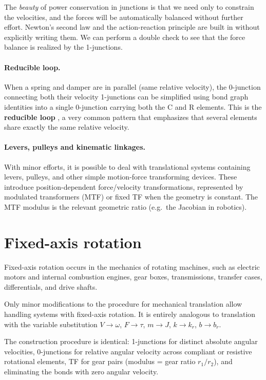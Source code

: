 The \emph{beauty} of power conservation in junctions is that we need only to constrain the velocities, and the forces will be automatically balanced without further effort. Newton's second law and the action-reaction principle are built in without explicitly writing them. We can perform a double check to see that the force balance is realized by the 1-junctions.



\paragraph{Reducible loop.}
When a spring and damper are in parallel (same relative velocity), the 0-junction connecting both their velocity 1-junctions can be simplified using bond graph identities into a single 0-junction carrying both the C and R elements. This is the \textbf{reducible loop} , a very common pattern that emphasizes that several elements share exactly the same relative velocity.

\paragraph{Levers, pulleys and kinematic linkages.}
With minor efforts, it is possible to deal with translational systems containing levers, pulleys, and other simple motion-force transforming devices. These introduce position-dependent force/velocity transformations, represented by modulated transformers (MTF) or fixed TF when the geometry is constant. The MTF modulus is the relevant geometric ratio (e.g.\ the Jacobian in robotics).

\section{Fixed-axis rotation}

Fixed-axis rotation occurs in the mechanics of rotating machines, such as electric motors and internal combustion engines, gear boxes, transmissions, transfer cases, differentials, and drive shafts.

Only minor modifications to the procedure for mechanical translation allow handling systems with fixed-axis rotation. It is entirely analogous to translation with the variable substitution $V \to \omega$, $F \to \tau$, $m \to J$, $k \to k_r$, $b \to b_r$. 

The construction procedure is identical: 1-junctions for distinct absolute angular velocities, 0-junctions for relative angular velocity across compliant or resistive rotational elements, TF for gear pairs (modulus = gear ratio $r_1/r_2$), and eliminating the bonds with zero angular velocity.

